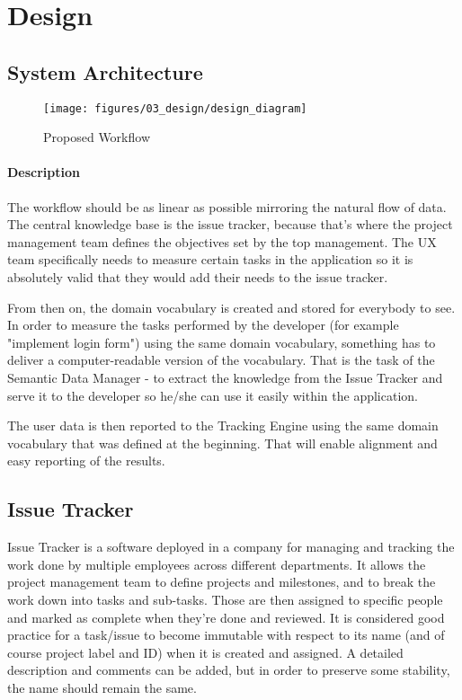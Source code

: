 \chapter{Design}

\section{System Architecture}

\begin{figure}[!ht]
	\centering
	\texttt{[image: figures/03\_design/design\_diagram]}
    \caption{Proposed Workflow}
\end{figure}

\subsubsection*{Description}

The workflow should be as linear as possible mirroring the natural flow of data. The central knowledge base is the issue tracker, because that's where the project management team defines the objectives set by the top management. The UX team specifically needs to measure certain tasks in the application so it is absolutely valid that they would add their needs to the issue tracker.

From then on, the domain vocabulary is created and stored for everybody to see. In order to measure the tasks performed by the developer (for example "implement login form") using the same domain vocabulary, something has to deliver a computer-readable version of the vocabulary. That is the task of the Semantic Data Manager - to extract the knowledge from the Issue Tracker and serve it to the developer so he/she can use it easily within the application.

The user data is then reported to the Tracking Engine using the same domain vocabulary that was defined at the beginning. That will enable alignment and easy reporting of the results.

\section{Issue Tracker}

Issue Tracker is a software deployed in a company for managing and tracking the work done by multiple employees across different departments. It allows the project management team to define projects and milestones, and to break the work down into tasks and sub-tasks. Those are then assigned to specific people and marked as complete when they're done and reviewed. It is considered good practice for a task/issue to become immutable with respect to its name (and of course project label and ID) when it is created and assigned. A detailed description and comments can be added, but in order to preserve some stability, the name should remain the same.

